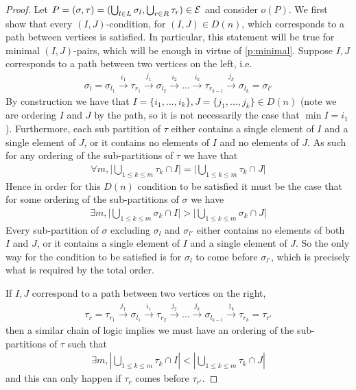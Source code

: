 \begin{proof}
Let $P=(\sigma,\tau) = (\bigcup_{l\in L}\sigma_l,\bigcup_{r\in R} \tau_r) \in \mathcal{E}$ and consider $o(P)$. 
We first show that every $(I,J)$-condition, for $(I,J) \in D(n)$, which corresponds to a path between vertices is satisfied. 
In particular, this statement will be true for minimal $(I,J)$-pairs, which will be enough in virtue of \cref{p:minimal}. 
Suppose $I,J$ corresponds to a path between two vertices on the left, i.e.
\begin{align*}
    \sigma_l = \sigma_{l_1} \xrightarrow{i_1} \tau_{r_1}\xrightarrow{j_1} \sigma_{l_2} \xrightarrow{i_2}... \xrightarrow{i_{k}} \tau_{r_{k-1}} \xrightarrow{j_k} \sigma_{l_k}= \sigma_{l'}
\end{align*}
By construction we have that $I = \{i_1,...,i_k\},J=\{j_1,...,j_k\} \in D(n)$ (note we are ordering $I$ and $J$ by the path, so it is not necessarily the case that $\min I = i_1$). 
Furthermore, each sub partition of $\tau$ either contains a single element of $I$ and a single element of $J$, or it contains no elements of $I$ and no elements of $J$. 
As such for any ordering of the sub-partitions of $\tau$ we have that 
\begin{align*}
    \forall m, \bigg|\bigcup_{1\leq k \leq m} \tau_{k} \cap I \bigg| = \bigg|\bigcup_{1\leq k \leq m} \tau_{k} \cap J \bigg|
\end{align*}
Hence in order for this $D(n)$ condition to be satisfied it must be the case that for some ordering of the sub-partitions of $\sigma$ we have
\begin{align*}
    \exists m, \bigg| \bigcup_{1\leq k \leq m} \sigma_k \cap I \bigg| > \bigg|\bigcup_{1\leq k \leq m} \sigma_k \cap J \bigg|
\end{align*}
Every sub-partition of $\sigma$ excluding $\sigma_l$ and $\sigma_{l'}$ either contains no elements of both $I$ and $J$, or it contains a single element of $I$ and a single element of $J$. 
So the only way for the condition to be satisfied is for $\sigma_l$ to come before $\sigma_{l'}$, which is precisely what is required by the total order.

If $I,J$ correspond to a path between two vertices on the right,
\begin{align*}
    \tau_r = \tau_{r_1} \xrightarrow{j_1} \sigma_{l_1}\xrightarrow{i_1} \tau_{r_2} \xrightarrow{j_2}... \xrightarrow{j_{k}} \sigma_{l_{k-1}} \xrightarrow{1_k} \tau_{r_k}=\tau_{r'}
\end{align*}
then a similar chain of logic implies we must have an ordering of the sub-partitions of $\tau$ such that
\begin{align*}
    \exists m, |\bigcup_{1\leq k \leq m}\tau_k \cap I| < |\bigcup_{1\leq k \leq m} \tau_k \cap J|
\end{align*}
and this can only happen if $\tau_r$ comes before $\tau_{r'}$.
\end{proof}

